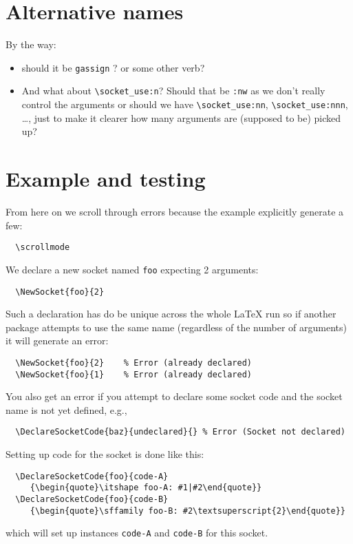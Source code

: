 \documentclass{article}
\newcommand\cs[1]{\texttt{\textbackslash #1}}
\begin{document}
\section{Alternative names}


By the way:
\begin{itemize}
\item
  should it be \texttt{gassign} ? or some other verb?
\item
  And what about \cs{socket\_use:n}? Should that be \texttt{:nw}
  as we don't really control the arguments or should we have
  \cs{socket\_use:nn}, \cs{socket\_use:nnn}, \ldots, just to make it
  clearer how many arguments are (supposed to be) picked up?
\end{itemize}




\section{Example and testing}

From here on we scroll through errors because the example explicitly generate a few:
\begin{verbatim}
  \scrollmode
\end{verbatim}
\scrollmode

We declare a new socket named \texttt{foo} expecting 2 arguments:
\begin{verbatim}
  \NewSocket{foo}{2}
\end{verbatim}

Such a declaration has do be unique across the whole \LaTeX{} run so
if another package attempts to use the same name (regardless of the
number of arguments) it will generate an error:
\begin{verbatim}
  \NewSocket{foo}{2}    % Error (already declared)
  \NewSocket{foo}{1}    % Error (already declared)
\end{verbatim}

You also get an error if you attempt to declare some socket code and the
socket name is not yet defined, e.g.,
\begin{verbatim}
  \DeclareSocketCode{baz}{undeclared}{} % Error (Socket not declared)
\end{verbatim}


Setting up code for the socket is done like this:
\begin{verbatim}
  \DeclareSocketCode{foo}{code-A}
     {\begin{quote}\itshape foo-A: #1|#2\end{quote}}
  \DeclareSocketCode{foo}{code-B}
     {\begin{quote}\sffamily foo-B: #2\textsuperscript{2}\end{quote}}
\end{verbatim}
which will set up instances \texttt{code-A} and \texttt{code-B} for
this socket.
\end{document}

